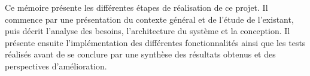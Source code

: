 \par Ce mémoire présente les différentes étapes de réalisation de ce projet. Il commence par une présentation du contexte général et de l'étude de l'existant, puis décrit l'analyse des besoins, l'architecture du système et la conception. Il présente ensuite l'implémentation des différentes fonctionnalités ainsi que les tests réalisés avant de se conclure par une synthèse des résultats obtenus et des perspectives d'amélioration.